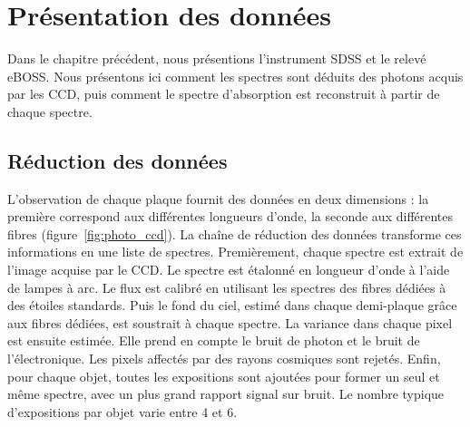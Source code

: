 
% 

% 

\graphicspath{ {../figures/donnees/} }

\chapter{Présentation des données}
\minitoc
\newpage
\thispagestyle{fancy}

Dans le chapitre précédent, nous présentions l'instrument SDSS et le relevé eBOSS.
Nous présentons ici comment les spectres sont déduits des photons acquis par les CCD, puis comment le spectre d'absorption est reconstruit à partir de chaque spectre.

\section{Réduction des données}
\label{sec:reduction_donnees}
L'observation de chaque plaque fournit des données en deux dimensions : la première correspond aux différentes longueurs d'onde, la seconde aux différentes fibres (figure~\ref{fig:photo_ccd}). La chaîne de réduction des données transforme ces informations en une liste de spectres.
Premièrement, chaque spectre est extrait de l'image acquise par le CCD. Le spectre est étalonné en longueur d'onde à l'aide de lampes à arc. Le flux est calibré en utilisant les spectres des fibres dédiées à des étoiles standards.
Puis le fond du ciel, estimé dans chaque demi-plaque grâce aux fibres dédiées, est soustrait à chaque spectre.
La variance dans chaque pixel est ensuite estimée. Elle prend en compte le bruit de photon et le bruit de l'électronique. Les pixels affectés par des rayons cosmiques sont rejetés.
Enfin, pour chaque objet, toutes les expositions sont ajoutées pour former un seul et même spectre, avec un plus grand rapport signal sur bruit. Le nombre typique d'expositions par objet varie entre 4 et 6.

